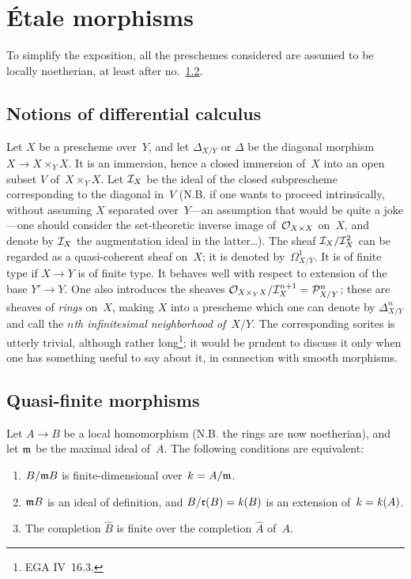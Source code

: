 \chapter{\'Etale morphisms}
\label{I}

To simplify the exposition, all the preschemes considered are assumed
to be locally noetherian, at least after no.~\ref{I.2}.

\section{Notions of differential calculus}
\label{I.1}

Let $X$ be a prescheme over~$Y$, and let $\Delta_{X/Y}$ or $\Delta$
be the diagonal morphism $X\to X\times_Y X$. It is an immersion,
hence a closed immersion of~$X$ into an open subset $V$ of~$X\times_Y X$.
Let $\cal{I}_X$ be the ideal of the closed subprescheme corresponding
to the diagonal in~$V$ (N.B. if one wants to proceed intrinsically,
without assuming $X$ separated over~$Y$---an assumption that would be
quite a joke---one should consider the set-theoretic inverse image
of~$\cal{O}_{X\times X}$ on~$X$, and denote by $\cal{I}_X$ the
augmentation ideal in the latter\ldots). The sheaf
$\cal{I}_X/\cal{I}_X^2$ can be regarded as a quasi-coherent sheaf
on~$X$; it is denoted by~$\mathit{\Omega}^1_{X/Y}$.
It is of finite type if $X\to Y$ is of finite type. It behaves well
with respect to extension of the base $Y'\to Y$. One also introduces
the sheaves $\cal{O}_{X\times_Y X}/\cal{I}_X^{n+1}=\cal{P}^n_{X/Y}$;
these are sheaves of \emph{rings} on~$X$, making $X$ into a prescheme
which one can denote by $\Delta_{X/Y}^n$ and call the
\emph{$n$th infinitesimal neighborhood of}~$X/Y$.
The corresponding sorites is utterly trivial, although rather
long\footnote{\cf EGA IV~16.3.}; it would be prudent to discuss it
only when one has something useful to say about it, in connection
with smooth morphisms.

\section{Quasi-finite morphisms}
\label{I.2}

\begin{proposition}
\label{I.2.1}
Let $A\to B$ be a local homomorphism (N.B. the rings are now
noetherian), and let $\goth{m}$ be the maximal ideal of~$A$.
The following conditions are equivalent:
\begin{enumerate}
\item[(i)] $B/\goth{m}B$ is finite-dimensional over~$k=A/\goth{m}$.
\item[(ii)] $\goth{m}B$ is an ideal of definition, and
$B/\goth{r}(B)=\kres(B)$ is an extension of~$k=\kres(A)$.
\item[(iii)] The completion $\widehat{B}$ is finite over the
completion $\widehat{A}$ of~$A$.
\end{enumerate}
\end{proposition}

